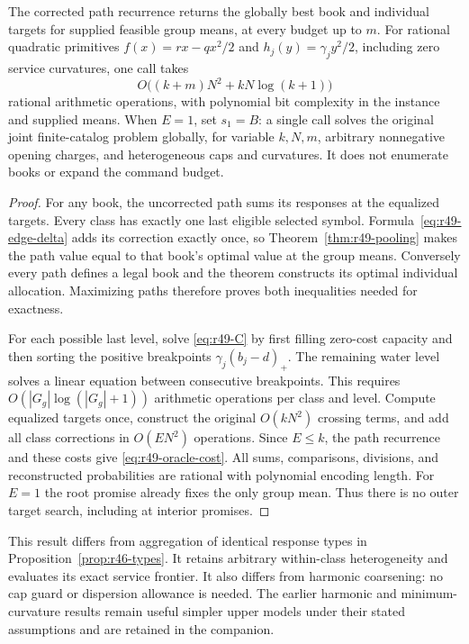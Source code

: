 \begin{theorem}\label{thm:r49-frontier}
The corrected path recurrence returns the globally best book and individual targets for supplied feasible group means, at every budget up to $m$. For rational quadratic primitives $f(x)=rx-qx^2/2$ and $h_j(y)=\gamma_jy^2/2$, including zero service curvatures, one call takes
\begin{equation}\label{eq:r49-oracle-cost}
 O\bigl((k+m)N^2+kN\log(k+1)\bigr)
\end{equation}
rational arithmetic operations, with polynomial bit complexity in the instance and supplied means. When $E=1$, set $s_1=B$: a single call solves the original joint finite-catalog problem globally, for variable $k,N,m$, arbitrary nonnegative opening charges, and heterogeneous caps and curvatures. It does not enumerate books or expand the command budget.
\end{theorem}
\begin{proof}
For any book, the uncorrected path sums its responses at the equalized targets. Every class has exactly one last eligible selected symbol. Formula~\eqref{eq:r49-edge-delta} adds its correction exactly once, so Theorem~\ref{thm:r49-pooling} makes the path value equal to that book's optimal value at the group means. Conversely every path defines a legal book and the theorem constructs its optimal individual allocation. Maximizing paths therefore proves both inequalities needed for exactness.

For each possible last level, solve \eqref{eq:r49-C} by first filling zero-cost capacity and then sorting the positive breakpoints $\gamma_j(b_j-d)_+$. The remaining water level solves a linear equation between consecutive breakpoints. This requires $O(|G_g|\log(|G_g|+1))$ arithmetic operations per class and level. Compute equalized targets once, construct the original $O(kN^2)$ crossing terms, and add all class corrections in $O(EN^2)$ operations. Since $E\leq k$, the path recurrence and these costs give \eqref{eq:r49-oracle-cost}. All sums, comparisons, divisions, and reconstructed probabilities are rational with polynomial encoding length. For $E=1$ the root promise already fixes the only group mean. Thus there is no outer target search, including at interior promises.\end{proof}

This result differs from aggregation of identical response types in Proposition~\ref{prop:r46-types}. It retains arbitrary within-class heterogeneity and evaluates its exact service frontier. It also differs from harmonic coarsening: no cap guard or dispersion allowance is needed. The earlier harmonic and minimum-curvature results remain useful simpler upper models under their stated assumptions and are retained in the companion.
